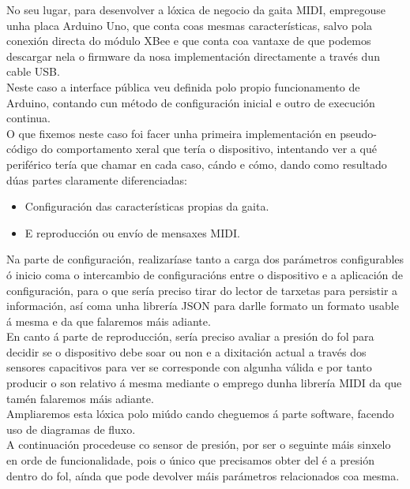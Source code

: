    No seu lugar, para desenvolver a lóxica de negocio da gaita MIDI, empregouse
   unha placa Arduino Uno, que conta coas mesmas características, salvo pola
   conexión directa do módulo XBee e que conta coa vantaxe de que podemos
   descargar nela o firmware da nosa implementación directamente a través dun
   cable USB. \\
   
   Neste caso a interface pública veu definida polo propio funcionamento de
   Arduino, contando cun método de configuración inicial e outro de execución
   continua. \\
   
   O que fixemos neste caso foi facer unha primeira implementación en
   pseudo-código do comportamento xeral que tería o dispositivo, intentando
   ver a qué periférico tería que chamar en cada caso, cándo e cómo, dando como
   resultado dúas partes claramente diferenciadas:
   
   \begin{itemize}
    \item Configuración das características propias da gaita.
    \item E reproducción ou envío de mensaxes MIDI.
   \end{itemize}
   
   Na parte de configuración, realizaríase tanto a carga dos parámetros
   configurables ó inicio coma o intercambio de configuracións entre o
   dispositivo e a aplicación de configuración, para o que sería preciso tirar
   do lector de tarxetas para persistir a información, así coma unha librería
   JSON para darlle formato un formato usable á mesma e da que falaremos máis
   adiante. \\
   
   En canto á parte de reproducción, sería preciso avaliar a presión do fol para
   decidir se o dispositivo debe soar ou non e a dixitación actual a través dos
   sensores capacitivos para ver se corresponde con algunha válida e por tanto
   producir o son relativo á mesma mediante o emprego dunha librería MIDI da que
   tamén falaremos máis adiante. \\
   
   Ampliaremos esta lóxica polo miúdo cando cheguemos á parte software, facendo
   uso de diagramas de fluxo. \\
   
   A continuación procedeuse co sensor de presión, por ser o seguinte máis
   sinxelo en orde de funcionalidade, pois o único que precisamos obter del é a
   presión dentro do fol, aínda que pode devolver máis parámetros relacionados
   coa mesma. \\
   
